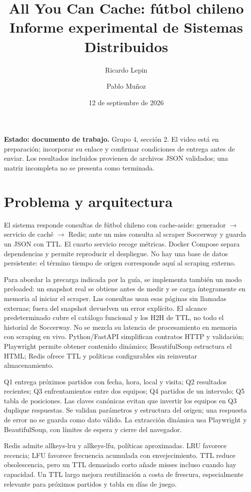 \documentclass[11pt]{article}
\title{All You Can Cache: fútbol chileno\\Informe experimental de Sistemas Distribuidos}
\author{Ricardo Lepin \and Pablo Muñoz}
\date{12 de septiembre de 2026}
\begin{document}
\sloppy
\maketitle
\noindent\textbf{Estado: documento de trabajo.} Grupo 4, sección 2. El video está en preparación; incorporar su enlace y confirmar condiciones de entrega antes de enviar. Los resultados incluidos provienen de archivos JSON validados; una matriz incompleta no se presenta como terminada.
\section{Problema y arquitectura}
El sistema responde consultas de fútbol chileno con cache-aside: generador $\to$ servicio de caché $\to$ Redis; ante un miss consulta al scraper Soccerway y guarda un JSON con TTL. El cuarto servicio recoge métricas. Docker Compose separa dependencias y permite reproducir el despliegue. No hay una base de datos persistente: el término tiempo de origen corresponde aquí al scraping externo.

Para abordar la precarga indicada por la guía, se implementa también un modo preloaded: un snapshot real se obtiene antes de medir y se carga íntegramente en memoria al iniciar el scraper. Las consultas usan esas páginas sin llamadas externas; fuera del snapshot devuelven un error explícito. El alcance predeterminado cubre el catálogo funcional y los H2H de TTL, no todo el historial de Soccerway. No se mezcla su latencia de procesamiento en memoria con scraping en vivo. Python/FastAPI simplifican contratos HTTP y validación; Playwright permite obtener contenido dinámico; BeautifulSoup estructura el HTML; Redis ofrece TTL y políticas configurables sin reinventar almacenamiento.

Q1 entrega próximos partidos con fecha, hora, local y visita; Q2 resultados recientes; Q3 enfrentamientos entre dos equipos; Q4 partidos de un intervalo; Q5 tabla de posiciones. Las claves canónicas evitan que invertir los equipos en Q3 duplique respuestas. Se validan parámetros y estructura del origen; una respuesta de error no se guarda como dato válido. La extracción dinámica usa Playwright y BeautifulSoup, con límites de espera y cierre del navegador.

Redis admite allkeys-lru y allkeys-lfu, políticas aproximadas. LRU favorece recencia; LFU favorece frecuencia acumulada con envejecimiento. TTL reduce obsolescencia, pero un TTL demasiado corto añade misses incluso cuando hay capacidad. Un TTL largo mejora reutilización a costa de frescura, especialmente relevante para próximos partidos y tabla en días de juego.
\end{document}
